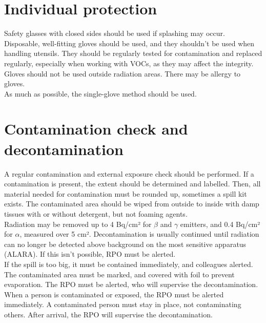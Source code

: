 \section{Individual protection}
Safety glasses with closed sides should be used if splashing may occur. Disposable, well-fitting gloves should be used, and they shouldn't be used when handling utensils. They should be regularly tested for contamination and replaced regularly, especially when working with VOCs, as they may affect the integrity. Gloves should not be used outside radiation areas. There may be allergy to gloves. \\
As much as possible, the single-glove method should be used.
\section{Contamination check and decontamination}
A regular contamination and external exposure check should be performed. If a contamination is present, the extent should be determined and labelled. Then, all material needed for contamination must be rounded up, sometimes a spill kit exists. The contaminated area should be wiped from outside to inside with damp tissues with or without detergent, but not foaming agents. \\
Radiation may be removed up to 4 Bq/cm² for $\beta$ and $\gamma$ emitters, and 0.4 Bq/cm² for $\alpha$, measured over 5 cm². Decontamination is usually continued until radiation can no longer be detected above background on the most sensitive apparatus (ALARA). If this isn't possible, RPO must be alerted. \\
If the spill is too big, it must be contained immediately, and colleagues alerted. The contaminated area must be marked, and covered with foil to prevent evaporation. The RPO must be alerted, who will supervise the decontamination.\\
When a person is contaminated or exposed, the RPO must be alerted immediately. A contaminated person must stay in place, not contaminating others. After arrival, the RPO will supervise the decontamination.
